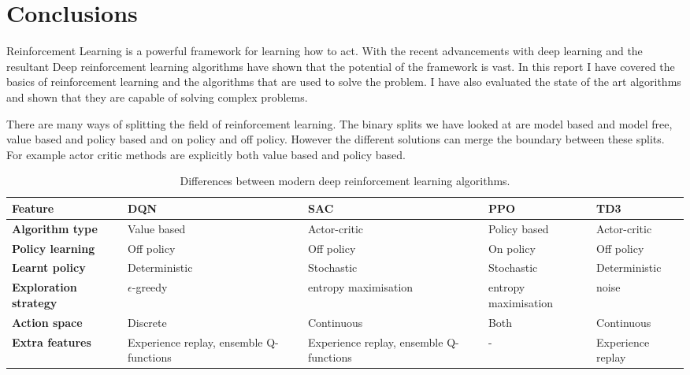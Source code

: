 \chapter{Conclusions}\label{C:con}

Reinforcement Learning is a powerful framework for learning how to act. With the recent advancements with deep learning and the resultant Deep reinforcement learning algorithms have shown that the potential of the framework is vast. In this report I have covered the basics of reinforcement learning and the algorithms that are used to solve the problem. I have also evaluated the state of the art algorithms and shown that they are capable of solving complex problems. 

There are many ways of splitting the field of reinforcement learning. The binary splits we have looked at are model based and model free, value based and policy based and on policy and off policy. However the different solutions can merge the boundary between these splits. For example actor critic methods are explicitly both value based and policy based.



\begin{table}[h]
    \footnotesize
    \centering
    \renewcommand{\arraystretch}{1.4} %
    \begin{tabularx}{\textwidth}{p{1.3cm} X X X X}
        \hline
        \textbf{Feature} & \textbf{DQN} & \textbf{SAC} & \textbf{PPO} & \textbf{TD3} \\
        \hline
        \textbf{Algorithm type}       & Value based      & Actor-critic         & Policy based               & Actor-critic  \\
        \textbf{Policy learning}      & Off policy        & Off policy           & On policy            & Off policy    \\
        \textbf{Learnt policy}        & Deterministic     & Stochastic           & Stochastic           & Deterministic \\
        \textbf{Exploration strategy} & $\epsilon$-greedy & entropy maximisation & entropy maximisation & noise         \\
        \textbf{Action space}         & Discrete          & Continuous           & Both                 & Continuous    \\
        \textbf{Extra features} & Experience replay, ensemble Q-functions & Experience replay, ensemble Q-functions & - & Experience replay \\
        \hline
    \end{tabularx}
    \caption{Differences between modern deep reinforcement learning algorithms.}
\end{table}


